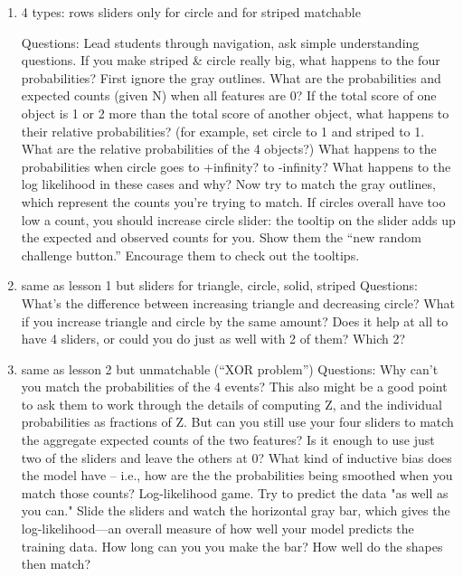 \documentclass[11pt,letterpaper]{article}
\begin{document}
\begin{enumerate}
\item 
4 types: rows %
sliders only for circle and for striped
matchable

Questions: Lead students through navigation, ask simple understanding questions. If you make striped \& circle really big, what happens to the four probabilities?  First ignore the gray outlines.  What are the probabilities and expected counts (given N) when all features are 0?  If the total score of one object is 1 or 2 more than the total score of another object, what happens to their relative probabilities?  (for example, set circle to 1 and striped to 1.  What are the relative probabilities of the 4 objects?)  What happens to the probabilities when circle goes to +infinity?  to -infinity?  What happens to the log likelihood in these cases and why?  Now try to match the gray outlines, which represent the counts you’re trying to match.  If circles overall have too low a count, you should increase circle slider: the tooltip on the slider adds up the expected and observed counts for you.  Show them the “new random challenge button.”  Encourage them to check out the tooltips.
\item same as lesson 1 but sliders for triangle, circle, solid, striped
Questions: What’s the difference between increasing triangle and decreasing circle?  What if you increase triangle and circle by the same amount?  Does it help at all to have 4 sliders, or could you do just as well with 2 of them? Which 2?
\item same as lesson 2 but unmatchable (“XOR problem”)
Questions: Why can’t you match the probabilities of the 4 events? This also might be a good point to ask them to work through the details of computing Z, and the individual probabilities as fractions of Z. But can you still use your four sliders to match the aggregate expected counts of the two features?  Is it enough to use just two of the sliders and leave the others at 0?  What kind of inductive bias does the model have -- i.e., how are the the probabilities being smoothed when you match those counts?    
Log-likelihood game. Try to predict the data "as well as you can." Slide the sliders and watch the horizontal gray bar, which gives the log-likelihood—an overall measure of how well your model predicts the training data. How long can you you make the bar? How well do the shapes then match?


\end{enumerate}
\end{document}
